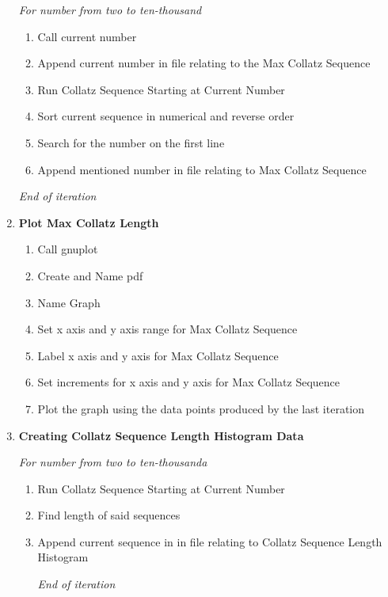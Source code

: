 \documentclass[11pt]{article} %
\begin{document}
\begin{flushleft}
\begin{enumerate}
\emph{For number from two to ten-thousand}
\begin{enumerate}
\item Call current number
\item Append current number in file relating to the Max Collatz Sequence
\item Run Collatz Sequence Starting at Current Number
\item Sort current sequence in numerical and reverse order
 \item Search for the number on the first line
\item Append mentioned number in file relating to Max Collatz Sequence
 \end{enumerate}
\emph{End of iteration}
\item \small {\textbf{Plot Max Collatz Length}}
\begin{enumerate}
\item Call gnuplot
\item Create and Name pdf
\item Name Graph
\item Set x axis and y axis range for Max Collatz Sequence
\item Label x axis and y axis for Max Collatz Sequence
\item Set increments for x axis and y axis for Max Collatz Sequence
\item Plot the graph using the data points produced by the last iteration
\end{enumerate}
\item\small{\textbf{Creating Collatz Sequence Length Histogram Data}}

\emph{For number from two to ten-thousanda}
\begin{enumerate}
\item Run Collatz Sequence Starting at Current Number
\item Find length of said sequences
\item Append current sequence in in file relating to Collatz Sequence Length Histogram

\emph{End of iteration}


\end{enumerate}
\end{enumerate}
\end{flushleft}
\end{document}
